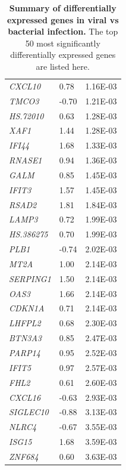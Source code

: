 \begin{table}
\begin{center}
{\begin{tabular}{lll}
\textit{CXCL10}    & 0.78           & 1.16E-03           \\
\textit{TMCO3}     & -0.70          & 1.21E-03           \\
\textit{HS.72010}  & 0.63           & 1.28E-03           \\
\textit{XAF1}      & 1.44           & 1.28E-03           \\
\textit{IFI44}     & 1.68           & 1.33E-03           \\
\textit{RNASE1}    & 0.94           & 1.36E-03           \\
\textit{GALM}      & 0.85           & 1.45E-03           \\
\textit{IFIT3}     & 1.57           & 1.45E-03           \\
\textit{RSAD2}     & 1.81           & 1.84E-03           \\
\textit{LAMP3}     & 0.72           & 1.99E-03           \\
\textit{HS.386275} & 0.70           & 1.99E-03           \\
\textit{PLB1}      & -0.74          & 2.02E-03           \\
\textit{MT2A}      & 1.00           & 2.14E-03           \\
\textit{SERPING1}  & 1.50           & 2.14E-03           \\
\textit{OAS3}      & 1.66           & 2.14E-03           \\
\textit{CDKN1A}    & 0.71           & 2.14E-03           \\
\textit{LHFPL2}    & 0.68           & 2.30E-03           \\
\textit{BTN3A3}    & 0.85           & 2.47E-03           \\
\textit{PARP14}    & 0.95           & 2.52E-03           \\
\textit{IFIT5}     & 0.97           & 2.57E-03           \\
\textit{FHL2}      & 0.61           & 2.60E-03           \\
\textit{CXCL16}    & -0.63          & 2.93E-03           \\
\textit{SIGLEC10}  & -0.88          & 3.13E-03           \\
\textit{NLRC4}     & -0.67          & 3.55E-03           \\
\textit{ISG15}     & 1.68           & 3.59E-03           \\
\textit{ZNF684}    & 0.60           & 3.63E-03                  


\end{tabular}}
\end{center}
\caption[Differentially expressed genes in viral infection]{\textbf{Summary of differentially expressed genes in viral vs bacterial infection.} The top 50 most significantly differentially expressed genes are listed here.} 
\label{tab:vb-de-genes}
\end{table}

